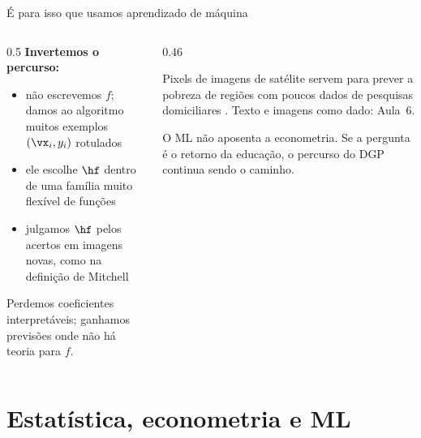 \documentclass[aspectratio=169,11pt]{beamer}
\begin{document}
\begin{frame}{É para isso que usamos aprendizado de máquina}
  \begin{columns}[T]
    \begin{column}{0.5\textwidth}
      \textbf{Invertemos o percurso:}
      \begin{itemize}\small
        \item não escrevemos $f$; damos ao algoritmo \alert{muitos exemplos}
              $(\vx_i, y_i)$ rotulados
        \item ele escolhe $\hf$ dentro de uma família \alert{muito flexível}
              de funções
        \item julgamos $\hf$ pelos acertos em \alert{imagens novas}, como na
              definição de Mitchell
      \end{itemize}
      \medskip
      \small Perdemos coeficientes interpretáveis; ganhamos previsões onde
      não há teoria para $f$.
    \end{column}
    \begin{column}{0.46\textwidth}
      \begin{exemplo}[title={E economistas com isso?}]
        \small Pixels de imagens de satélite servem para prever a pobreza de
        regiões com poucos dados de pesquisas domiciliares \parencite{jean2016}. Texto e
        imagens como dado: Aula~6.
      \end{exemplo}
      \begin{atencao}
        \small O ML não aposenta a econometria. Se a pergunta é o retorno da
        educação, o percurso do DGP continua sendo o caminho.
      \end{atencao}
    \end{column}
  \end{columns}
\end{frame}

\section{Estatística, econometria e ML}
\end{document}
